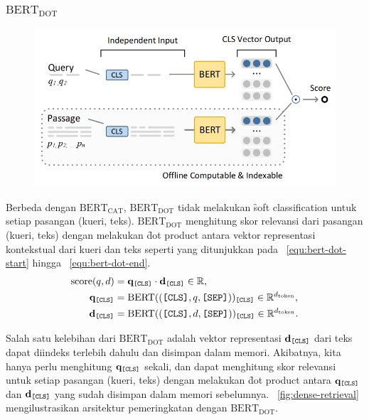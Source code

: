 		\subsubsection{$\text{BERT}_{\text{DOT}}$}
		\label{sec:bert-dot}
		\begin{figure}[!ht]
			\centering
			\includegraphics[width=1\textwidth]{assets/pics/bertdot.png}
			\label{fig:bert-dot}
		\end{figure}

		Berbeda dengan $\text{BERT}_{\text{CAT}}$, $\text{BERT}_{\text{DOT}}$ tidak melakukan \f{soft classification} untuk setiap pasangan (kueri, teks). $\text{BERT}_{\text{DOT}}$ menghitung skor relevansi dari pasangan (kueri, teks) dengan melakukan \f{dot product} antara vektor representasi kontekstual dari kueri dan teks seperti yang ditunjukkan pada \equ~\ref{equ:bert-dot-start} hingga \equ~\ref{equ:bert-dot-end}.
		\begin{align}
			\label{equ:bert-dot-start}
			\text{score}(q,d) &= \mathbf{q}_{\text{\texttt{[CLS]}}} \cdot \mathbf{d}_{\text{\texttt{[CLS]}}} \in \mathbb{R}, \\
			\mathbf{q}_{\text{\texttt{[CLS]}}} &= \text{BERT}((\text{\texttt{[CLS]}}, q, \text{\texttt{[SEP]}}))_{\text{\texttt{[CLS]}}} \in \mathbb{R}^{d_{\text{token}}}, \\
			\mathbf{d}_{\text{\texttt{[CLS]}}} &= \text{BERT}((\text{\texttt{[CLS]}}, d, \text{\texttt{[SEP]}}))_{\text{\texttt{[CLS]}}} \in \mathbb{R}^{d_{\text{token}}}.
			\label{equ:bert-dot-end}
		\end{align}

		Salah satu kelebihan dari $\text{BERT}_{\text{DOT}}$ adalah vektor representasi $\mathbf{d}_{\text{\texttt{[CLS]}}}$ dari teks dapat diindeks terlebih dahulu dan disimpan dalam memori. Akibatnya, kita hanya perlu menghitung $\mathbf{q}_{\text{\texttt{[CLS]}}}$ sekali, dan dapat menghitung skor relevansi untuk setiap pasangan (kueri, teks) dengan melakukan \f{dot product} antara $\mathbf{q}_{\text{\texttt{[CLS]}}}$ dan $\mathbf{d}_{\text{\texttt{[CLS]}}}$ yang sudah disimpan dalam memori sebelumnya. \pic~\ref{fig:dense-retrieval} mengilustrasikan arsitektur pemeringkatan dengan $\text{BERT}_{\text{DOT}}$.


